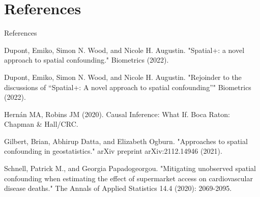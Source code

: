 \documentclass[10 pt]{beamer}
\begin{document}
\section{References}
\begin{frame}{References}
\tiny


Dupont, Emiko, Simon N. Wood, and Nicole H. Augustin. "Spatial+: a novel approach to spatial confounding." Biometrics (2022).
\bigskip

Dupont, Emiko, Simon N. Wood, and Nicole H. Augustin. "Rejoinder to the discussions of “Spatial+: A novel approach
to spatial confounding”" Biometrics (2022).
\bigskip

Hernán MA, Robins JM (2020). Causal Inference: What If. Boca Raton: Chapman \& Hall/CRC. \bigskip

Gilbert, Brian, Abhirup Datta, and Elizabeth Ogburn. "Approaches to spatial confounding in geostatistics." arXiv preprint arXiv:2112.14946 (2021).
\bigskip

Schnell, Patrick M., and Georgia Papadogeorgou. "Mitigating unobserved spatial confounding when estimating the effect of supermarket access on cardiovascular disease deaths." The Annals of Applied Statistics 14.4 (2020): 2069-2095.


\end{frame}
\end{document}
